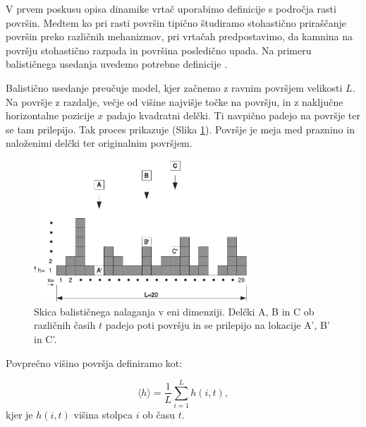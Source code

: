\documentclass[a4paper, twoside, 12pt]{book}
\begin{document}
  V prvem poskusu opisa dinamike vrtač uporabimo definicije s področja rasti površin. Medtem ko pri rasti površin tipično študiramo stohastično priraščanje površin preko različnih mehanizmov, pri vrtačah predpostavimo, da kamnina na površju stohastično razpada in površina posledično upada. Na primeru balističnega usedanja uvedemo potrebne definicije \cite{barabasi1995fractal}.

Balistično usedanje preučuje model, kjer začnemo z ravnim površjem velikosti $L$. Na površje z razdalje, večje od višine najvišje točke na površju, in z naključne horizontalne pozicije $x$ padajo kvadratni delčki. Ti navpično padejo na površje ter se tam prilepijo. Tak proces prikazuje (Slika \ref{fig:bdep}).
Površje je meja med praznino in naloženimi delčki ter originalnim površjem.

    \begin{figure}[h]
      \begin{center}
        \includegraphics[width=8cm]{slike/bdep2.pdf}
      \end{center}
      \caption{Skica balističnega nalaganja v eni dimenziji. Delčki A, B in C ob različnih časih $t$ padejo poti površju in se prilepijo na lokacije A’, B’ in C’.}
      \label{fig:bdep}
    \end{figure}

Povprečno višino površja definiramo kot:

  \begin{equation}
    \langle h \rangle = \frac{1}{L} \sum_{i=1}^L h(i,t),
    \label{povprecna-visina}
  \end{equation}
kjer je $h(i,t)$ višina stolpca $i$ ob času $t$.
\end{document}
